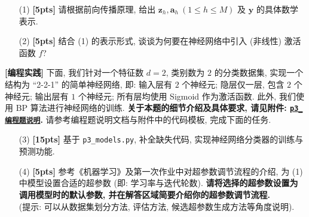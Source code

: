 \documentclass[a4paper,UTF8]{article}
\numberwithin{equation}{section}
\theoremstyle{definition}
\begin{document}
\begin{enumerate}
    \item [(1)] \textbf{[5pts]} 请根据前向传播原理, 给出 $\mathbf{z}_h, \mathbf{a}_h\ (1\leq h \leq M)$ 及 $\mathbf{y}$ 的具体数学表示.
    \item [(2)] \textbf{[5pts]} 结合 (1) 的表示形式, 谈谈为何要在神经网络中引入 (非线性) 激活函数 $f$?
\end{enumerate}

\textbf{[编程实践]} 下面, 我们针对一个特征数 $d=2$, 类别数为 $2$ 的分类数据集, 实现一个结构为 ``2-2-1'' 的简单神经网络, 即: 输入层有 $2$ 个神经元; 隐层仅一层, 包含 $2$ 个神经元; 输出层有 $1$ 个神经元; 所有层均使用 Sigmoid 作为激活函数. 此外, 我们使用 BP 算法进行神经网络的训练. \textbf{关于本题的细节介绍及具体要求, 请见附件: \href{https://www.lamda.nju.edu.cn/ML2024Spring/homework/HW3/p3_guide.pdf}{\texttt{p3\hspace{0em}\_\hspace{0em}编程题说明}}.} 请参考编程题说明文档与附件中的代码模板, 完成下面的任务.

\begin{enumerate}
    \item [(3)] \textbf{[15pts]} 基于 \texttt{p3\_models.py}, 补全缺失代码, 实现神经网络分类器的训练与预测功能.
    \item [(4)] \textbf{[5pts]} 参考《机器学习》及第一次作业中对超参数调节流程的介绍, 为 (1) 中模型设置合适的超参数 (即: 学习率与迭代轮数). \textbf{请将选择的超参数设置为调用模型时的默认参数, 并在解答区域简要介绍你的超参数调节流程.}\\(提示: 可以从数据集划分方法, 评估方法, 候选超参数生成方法等角度说明).
\end{enumerate}
\end{document}
